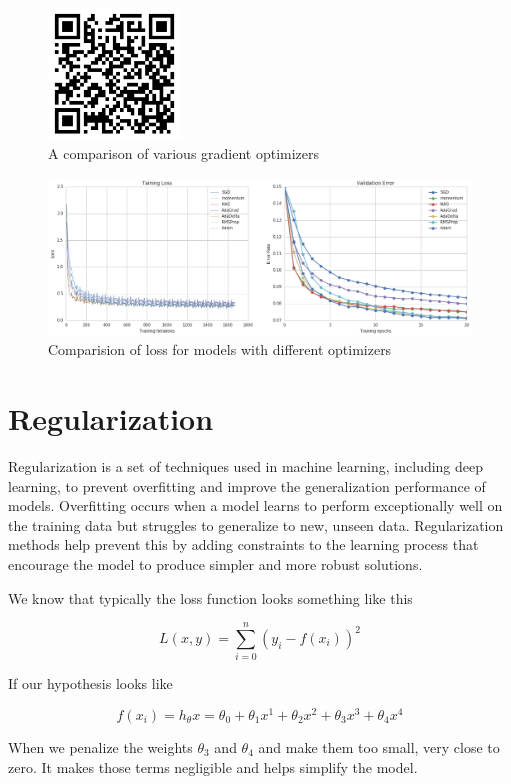 \documentclass{report}
\begin{document}
\begin{figure}[ht]
	\includegraphics[width=100pt]{14}
	\centering
	\caption{A comparison of various gradient optimizers}
\end{figure}
\begin{figure}[ht]
	\includegraphics[width=450pt]{15}
	\centering
	\caption{Comparision of loss for models with different optimizers}
\end{figure}

\section{Regularization}
Regularization is a set of techniques used in machine learning, including deep learning, to prevent overfitting and improve the generalization performance of models. Overfitting occurs when a model learns to perform exceptionally well on the training data but struggles to generalize to new, unseen data. Regularization methods help prevent this by adding constraints to the learning process that encourage the model to produce simpler and more robust solutions.

We know that typically the loss function looks something like this

$$L(x,y) = \sum_{i=0}^n (y_i - f(x_i))^2$$

If our hypothesis looks like

$$f(x_i) = h_{\theta}x = \theta_0 + \theta_1 x^1 + \theta_2 x^2 + \theta_3 x^3 + \theta_4 x^4$$

When we penalize the weights $\theta_3$ and $\theta_4$ and make them too small, very close to zero. It makes those terms negligible and helps simplify the model.
\end{document}
